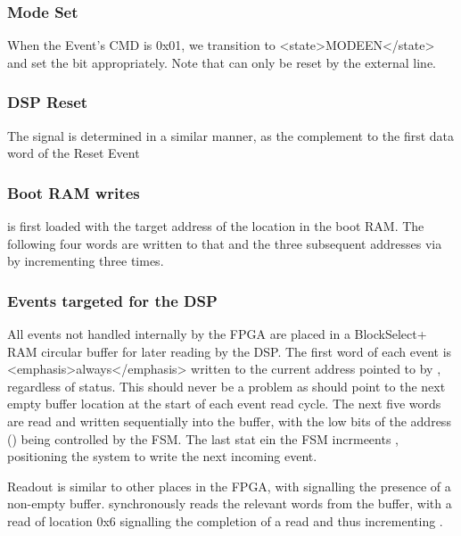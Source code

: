 \subsubsection{Mode Set}

When the Event's CMD is 0x01, we transition to <state>MODEEN</state>
and set the  bit appropriately. Note that
 can only be reset by the external
 line.

      
\subsubsection{DSP Reset}

The  signal is determined in a similar
manner, as the complement to the first data word of the Reset Event


\subsubsection{Boot RAM writes}


 is first loaded with the target address
of the location in the boot RAM. The following four words are written
to that and the three subsequent addresses via
 by incrementing
 three times.


\subsubsection{Events targeted for the DSP}

All events not handled internally by the FPGA are placed in a
BlockSelect+ RAM circular buffer for later reading by the DSP. The
first word of each event is <emphasis>always</emphasis> written to the
current address pointed to by , regardless
of  status. This should never be a problem as
 should point to the next empty buffer
location at the start of each event read cycle. The next five words
are read and written sequentially into the buffer, with the low bits
of the address () being controlled by the
FSM. The last stat ein the FSM incrmeents ,
positioning the system to write the next incoming event.

Readout is similar to other places in the FPGA, with
 signalling the presence of a non-empty
buffer.  synchronously reads the relevant
words from the buffer, with a read of location 0x6 signalling the
completion of a read and thus incrementing
.

